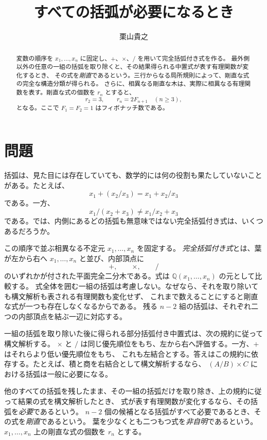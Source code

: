 \documentclass[11pt]{ltjsarticle}
\title{すべての括弧が必要になるとき}
\author{栗山貴之}
\date{}
\newcommand{\Q}{\mathbb{Q}}
\begin{document}
\maketitle

\begin{abstract}
変数の順序を $x_1,\ldots,x_n$ に固定し、$+$、$\times$、$/$ を用いて完全括弧付き式を作る。
最外側以外の任意の一組の括弧を取り除くと、その結果得られる中置式が表す有理関数が変化するとき、
その式を\emph{剛直}であるという。三行からなる局所規則によって、剛直な式の完全な構造分類が得られる。
さらに、相異なる剛直な木は、実際に相異なる有理関数を表す。剛直な式の個数を $r_n$ とすると、
\[
 r_2=3,
 \qquad
 r_n=2F_{n+1}\quad(n\ge3),
\]
となる。ここで $F_1=F_2=1$ はフィボナッチ数である。
\end{abstract}

\section{問題}

括弧は、見た目には存在していても、数学的には何の役割も果たしていないことがある。たとえば、
\[
 x_1+(x_2/x_3)=x_1+x_2/x_3
\]
である。一方、
\[
 x_1/(x_2+x_3)\ne x_1/x_2+x_3
\]
である。では、内側にあるどの括弧も無意味ではない完全括弧付き式は、いくつあるだろうか。

この順序で並ぶ相異なる不定元 $x_1,\ldots,x_n$ を固定する。
\emph{完全括弧付き式}とは、葉が左から右へ $x_1,\ldots,x_n$ と並び、内部頂点に
\[
 +,\qquad \times,\qquad /
\]
のいずれかが付された平面完全二分木である。式は $\Q(x_1,\ldots,x_n)$ の元として比較する。
式全体を囲む一組の括弧は考慮しない。なぜなら、それを取り除いても構文解析も表される有理関数も変化せず、
これまで数えることにすると剛直な式が一つも存在しなくなるからである。
残る $n-2$ 組の括弧は、それぞれ二つの内部頂点を結ぶ一辺に対応する。

一組の括弧を取り除いた後に得られる部分括弧付き中置式は、次の規約に従って構文解析する。
$\times$ と $/$ は同じ優先順位をもち、左から右へ評価する。一方、$+$ はそれらより低い優先順位をもち、
これも左結合とする。答えはこの規約に依存する。たとえば、積と商を右結合として構文解析するなら、
$(A/B)\times C$ における括弧は一般に必要になる。

他のすべての括弧を残したまま、その一組の括弧だけを取り除き、上の規約に従って結果の式を構文解析したとき、
式が表す有理関数が変化するなら、その括弧を\emph{必要}であるという。
$n-2$ 個の候補となる括弧がすべて必要であるとき、その式を\emph{剛直}であるという。
葉を少なくとも二つもつ式を\emph{非自明}であるという。
$x_1,\ldots,x_n$ 上の剛直な式の個数を $r_n$ とする。
\end{document}
